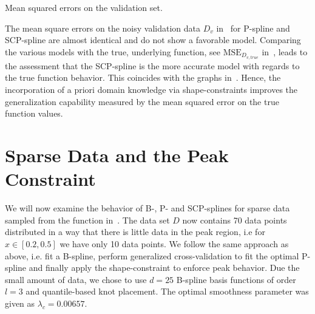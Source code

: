 \begin{table}[H]
	\begin{center}
	\end{center}
	\caption{Mean squared errors on the validation set.}
	\label{tab:test-func-peak-mses}
\end{table}
%
The mean square errors on the noisy validation data $D_v$ in~ for P-spline and SCP-spline are almost identical and do not show a favorable model. Comparing the various models with the true, underlying function, see $\text{MSE}_{D_{v,true}}$ in~, leads to the assessment that the SCP-spline is the more accurate model with regards to the true function behavior. This coincides with the graphs in~. Hence, the incorporation of a priori domain knowledge via shape-constraints improves the generalization capability measured by the mean squared error on the true function values. 

\section{Sparse Data and the Peak Constraint}

We will now examine the behavior of B-, P- and SCP-splines for sparse data sampled from the function in~. The data set $D$ now contains 70 data points distributed in a way that there is little data in the peak region, i.e for $x \in [0.2, 0.5]$ we have only 10 data points. We follow the same approach as above, i.e. fit a B-spline, perform generalized cross-validation to fit the optimal P-spline and finally apply the shape-constraint to enforce peak behavior. Due the small amount of data, we chose to use $d=25$ B-spline basis functions of order $l=3$ and quantile-based knot placement. The optimal smoothness parameter was given as $\lambda_c = 0.00657$. 

